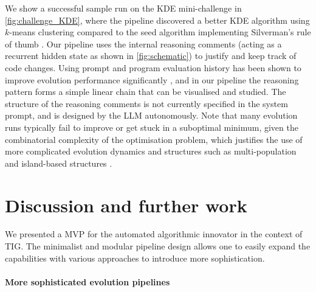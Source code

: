 \documentclass[12pt, legalpaper]{article}
\begin{document}
We show a successful sample run on the KDE mini-challenge in \autoref{fig:challenge_KDE}, where the pipeline discovered a better KDE algorithm using $k$-means clustering compared to the seed algorithm implementing Silverman's rule of thumb \citep{Silverman1986}. 
Our pipeline uses the internal reasoning comments (acting as a recurrent hidden state as shown in \autoref{fig:schematic}) to justify and keep track of code changes. 
Using prompt and program evaluation history has been shown to improve evolution performance significantly \citep{novikov2025alphaevolve}, and in our pipeline the reasoning pattern forms a simple linear chain that can be visualised and studied. 
The structure of the reasoning comments is not currently specified in the system prompt, and is designed by the LLM autonomously. 
Note that many evolution runs typically fail to improve or get stuck in a suboptimal minimum, given the combinatorial complexity of the optimisation problem, which justifies the use of more complicated evolution dynamics and structures such as multi-population and island-based structures \citep{romera2024mathematical, novikov2025alphaevolve}. 



\section{Discussion and further work}\label{sec:further}

We presented a MVP for the automated algorithmic innovator in the context of TIG. 
The minimalist and modular pipeline design allows one to easily expand the capabilities with various approaches to introduce more sophistication. 


\paragraph{More sophisticated evolution pipelines}
\end{document}
